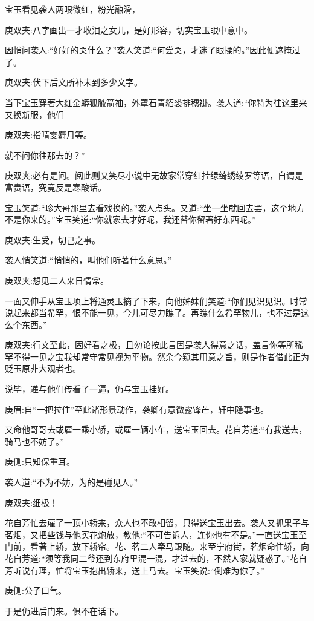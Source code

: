 \begin{parag}
    宝玉看见袭人两眼微红，粉光融滑，\begin{note}庚双夹:八字画出一才收泪之女儿，是好形容，切实宝玉眼中意中。\end{note}因悄问袭人:“好好的哭什么？”袭人笑道:“何尝哭，才迷了眼揉的。”因此便遮掩过了。\begin{note}庚双夹:伏下后文所补未到多少文字。\end{note}当下宝玉穿著大红金蟒狐腋箭袖，外罩石青貂裘排穗褂。袭人道:“你特为往这里来又换新服，他们\begin{note}庚双夹:指晴雯麝月等。\end{note}就不问你往那去的？”\begin{note}庚双夹:必有是问。阅此则又笑尽小说中无故家常穿红挂绿绮绣绫罗等语，自谓是富贵语，究竟反是寒酸话。\end{note}宝玉笑道:“珍大哥那里去看戏换的。”袭人点头。又道:“坐一坐就回去罢，这个地方不是你来的。”宝玉笑道:“你就家去才好呢，我还替你留著好东西呢。”\begin{note}庚双夹:生受，切己之事。\end{note}袭人悄笑道:“悄悄的，叫他们听著什么意思。”\begin{note}庚双夹:想见二人来日情常。\end{note}一面又伸手从宝玉项上将通灵玉摘了下来，向他姊妹们笑道:“你们见识见识。时常说起来都当希罕，恨不能一见，今儿可尽力瞧了。再瞧什么希罕物儿，也不过是这么个东西。”\begin{note}庚双夹:行文至此，固好看之极，且勿论按此言固是袭人得意之话，盖言你等所稀罕不得一见之宝我却常守常见视为平物。然余今窥其用意之旨，则是作者借此正为贬玉原非大观者也。\end{note}说毕，递与他们传看了一遍，仍与宝玉挂好。\begin{note}庚眉:自“一把拉住”至此诸形景动作，袭卿有意微露锋芒，轩中隐事也。\end{note}又命他哥哥去或雇一乘小轿，或雇一辆小车，送宝玉回去。花自芳道:“有我送去，骑马也不妨了。”\begin{note}庚侧:只知保重耳。\end{note}袭人道:“不为不妨，为的是碰见人。”\begin{note}庚双夹:细极！\end{note}
\end{parag}


\begin{parag}
    花自芳忙去雇了一顶小轿来，众人也不敢相留，只得送宝玉出去。袭人又抓果子与茗烟，又把些钱与他买花炮放，教他:“不可告诉人，连你也有不是。”一直送宝玉至门前，看著上轿，放下轿帘。花、茗二人牵马跟随。来至宁府街，茗烟命住轿，向花自芳道:“须等我同二爷还到东府里混一混，才过去的，不然人家就疑惑了。”花自芳听说有理，忙将宝玉抱出轿来，送上马去。宝玉笑说:“倒难为你了。”\begin{note}庚侧:公子口气。\end{note}于是仍进后门来。俱不在话下。
\end{parag}


